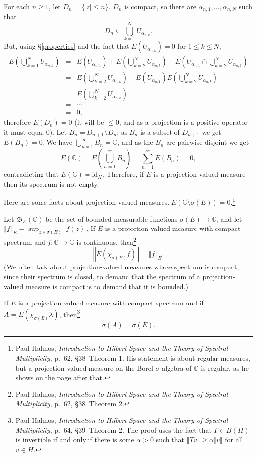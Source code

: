 \documentclass{article}
\newcommand{\id}{\textrm{id}}
\newcommand{\norm}[1]{\left\Vert #1 \right\Vert}
\begin{document}
For each $n \geq 1$, let $D_n=\{|z| \leq n\}$. $D_n$ is compact, so there are $\alpha_{n,1},\ldots,\alpha_{n,N}$ such that 
\[
D_n \subseteq \bigcup_{k=1}^N U_{\alpha_{n,k}}.
\]
But, using \S \ref{properties} and the fact that $E(U_{\alpha_{n,k}})=0$ for $1 \leq k \leq N$,
\begin{eqnarray*}
E\left( \bigcup_{k=1}^N U_{\alpha_{n,k}} \right) &=& E(U_{\alpha_{n,1}})+E\left(\bigcup_{k=2}^N U_{\alpha_{n,k}}\right)
-E\left(U_{\alpha_{n,1}} \cap \bigcup_{k=2}^N U_{\alpha_{n,k}} \right)\\
&=&E\left(\bigcup_{k=2}^N U_{\alpha_{n,k}}\right)-E(U_{\alpha_{n,1}} ) E\left(\bigcup_{k=2}^N U_{\alpha_{n,k}} \right)\\
&=&E\left(\bigcup_{k=2}^N U_{\alpha_{n,k}}\right)\\
&=&\cdots\\
&=&0,
\end{eqnarray*}
therefore $E(D_n)=0$ (it will be $\leq 0$, and as a projection is a positive operator it must equal $0$). Let $B_n=D_{n+1} \setminus D_n$;
as $B_n$ is a subset of $D_{n+1}$ we get $E(B_n) = 0$. We have $\bigcup_{n=1}^\infty B_n = \mathbb{C}$, and as the $B_n$ are pairwise
disjoint we get
\[
E(\mathbb{C})=E\left(\bigcup_{n=1}^\infty B_n\right)=\sum_{n=1}^\infty E(B_n)=0,
\]
contradicting that $E(\mathbb{C})=\id_H$. Therefore, if $E$ is a projection-valued measure then its spectrum is not empty.

Here are some facts about projection-valued measures.
$E(\mathbb{C} \setminus \sigma(E))=0$.\footnote{Paul Halmos,
{\em Introduction to Hilbert Space and the Theory of Spectral Multiplicity},
p.~62, \S 38, Theorem 1. His statement is about regular measures, but  a projection-valued measure on the Borel
$\sigma$-algebra of $\mathbb{C}$ is regular, as he shows on the page after that.} 

Let $\mathfrak{B}_E(\mathbb{C})$ be the set of
bounded measurable functions $\sigma(E) \to \mathbb{C}$, and let $\norm{f}_E = \sup_{z \in \sigma(E)} |f(z)|$. 
If $E$ is a projection-valued measure with compact spectrum and 
$f:\mathbb{C} \to \mathbb{C}$ is continuous, then\footnote{Paul Halmos,
{\em Introduction to Hilbert Space and the Theory of Spectral Multiplicity}, p.~62, \S 38, Theorem 2.}
\[
\norm{E(\chi_{\sigma(E)} f)}=\norm{f}_E.
\]
(We  often talk about projection-valued measures whose spectrum is compact;
since their spectrum is closed, to demand that the spectrum of a projection-valued measure is compact is to demand that it is bounded.)

If $E$ is a projection-valued measure with compact spectrum and if $A=E(\chi_{\sigma(E)} \lambda)$, then\footnote{Paul Halmos,
{\em Introduction to Hilbert Space and the Theory of Spectral Multiplicity}, p.~64, \S 39, Theorem 2. The proof uses the fact that $T \in B(H)$ is invertible if and only if
there is some $\alpha>0$ such that $\norm{Tv} \geq \alpha \norm{v}$ for all $v \in H$.}
\[
\sigma(A)=\sigma(E).
\]
\end{document}
